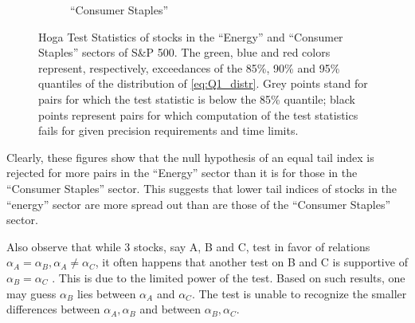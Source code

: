 \documentclass{article}
\begin{document}
\begin{figure}[htb!]
\begin{subfigure}[b]{0.5\linewidth}
    \caption{``Consumer Staples''}
    \label{fig:Hoga_consumer_Staples_pair}
  \end{subfigure}
  \caption{Hoga Test Statistics of stocks in the ``Energy'' and
    ``Consumer Staples'' sectors of
    S\&P 500. The green, blue and red colors represent, respectively,
    exceedances of the 85\%, 90\% and 95\% quantiles of the distribution of
    \eqref{eq:Q1_distr}.
    Grey points stand for pairs for which the test statistic is below
    the 85\% quantile;
    black points represent pairs for which
    computation of the test statistics fails for given precision
    requirements and time limits.}
\end{figure}
Clearly, these figures show that the null
hypothesis of an equal tail index is rejected for more pairs in the
``Energy'' sector than it is for those in the ``Consumer Staples''
sector. This suggests that lower tail indices of stocks in the
``energy'' sector are more spread out than are those of the ``Consumer
Staples'' sector.

Also observe that while 3 stocks, say A, B and C, test in favor of
relations $\alpha_A = \alpha_B, \alpha_A \neq \alpha_C$, it often
happens that another test on B and C is supportive of $\alpha_B =
\alpha_C$ . This is due to the limited power of the test. Based
on such results, one may guess $\alpha_B$ lies between $\alpha_A$ and
$\alpha_C$. The test is unable to recognize the smaller differences
between $\alpha_A, \alpha_B$ and between $\alpha_B, \alpha_C$.
\end{document}
